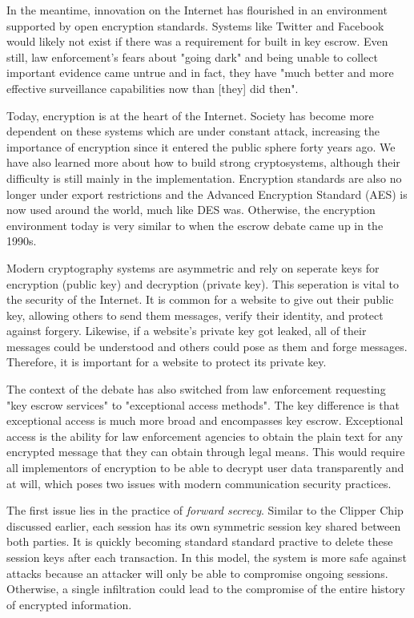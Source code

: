 \documentclass[12pt]{turabian-researchpaper}
\begin{document}
In the meantime, innovation on the Internet has flourished in an environment supported by open encryption standards.
Systems like Twitter and Facebook would likely not exist if there was a requirement for built in key escrow.
Even still, law enforcement's fears about "going dark" and being unable to collect important evidence came untrue and in fact, they have "much better and more effective surveillance capabilities now than [they] did then".

Today, encryption is at the heart of the Internet.
Society has become more dependent on these systems which are under constant attack, increasing the importance of encryption since it entered the public sphere forty years ago.
We have also learned more about how to build strong cryptosystems, although their difficulty is still mainly in the implementation.
Encryption standards are also no longer under export restrictions and the Advanced Encryption Standard (AES) is now used around the world, much like DES was.
Otherwise, the encryption environment today is very similar to when the escrow debate came up in the 1990s.

Modern cryptography systems are asymmetric and rely on seperate keys for encryption (public key) and decryption (private key).
This seperation is vital to the security of the Internet.
It is common for a website to give out their public key, allowing others to send them messages, verify their identity, and protect against forgery.
Likewise, if a website's private key got leaked, all of their messages could be understood and others could pose as them and forge messages.
Therefore, it is important for a website to protect its private key.

The context of the debate has also switched from law enforcement requesting "key escrow services" to "exceptional access methods".
The key difference is that exceptional access is much more broad and encompasses key escrow.
Exceptional access is the ability for law enforcement agencies to obtain the plain text for any encrypted message that they can obtain through legal means.
This would require all implementors of encryption to be able to decrypt user data transparently and at will, which poses two issues with modern communication security practices.

The first issue lies in the practice of \textit{forward secrecy}.
Similar to the Clipper Chip discussed earlier, each session has its own symmetric session key shared between both parties.
It is quickly becoming standard standard practive to delete these session keys after each transaction.
In this model, the system is more safe against attacks because an attacker will only be able to compromise ongoing sessions.
Otherwise, a single infiltration could lead to the compromise of the entire history of encrypted information.
\end{document}
